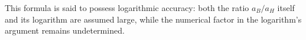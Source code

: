 This formula is said to possess logarithmic accuracy: both the ratio $a_B/a_H$ itself and its logarithm are assumed large, while the numerical factor in the logarithm's argument remains undetermined.

